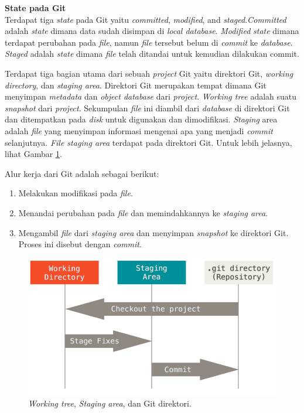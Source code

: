 \documentclass[a4paper,twoside]{article}
\begin{document}
\begin{enumerate}
\textbf{State pada Git}\\
Terdapat tiga \textit{state} pada Git yaitu \textit{committed}, \textit{modified}, and \textit{staged}.\textit{Committed} adalah \textit{state} dimana data sudah disimpan di \textit{local database}. \textit{Modified} \textit{state} dimana terdapat perubahan pada \textit{file}, namun \textit{file} tersebut belum di \textit{commit} ke \textit{database}. \textit{Staged} adalah \textit{state} dimana \textit{file} telah ditandai untuk kemudian dilakukan commit.

Terdapat tiga bagian utama dari sebuah \textit{project} Git yaitu direktori Git, \textit{working directory}, dan \textit{staging area}. Direktori Git merupakan tempat dimana Git menyimpan \textit{metadata} dan \textit{object database} dari \textit{project}. \textit{Working tree} adalah suatu \textit{snapshot} dari \textit{project}. Sekumpulan \textit{file} ini diambil dari \textit{database} di direktori Git dan ditempatkan pada \textit{disk} untuk digunakan dan dimodifikasi. \textit{Staging} area adalah \textit{file} yang menyimpan informasi mengenai apa yang menjadi \textit{commit} selanjutnya. \textit{File staging area} terdapat pada direktori Git. Untuk lebih jelasnya, lihat Gambar \ref{fig:git_state}.

Alur kerja dari Git adalah sebagai berikut:
\begin{enumerate}
\item Melakukan modifikasi pada \textit{file}.
\item Menandai perubahan pada \textit{file} dan memindahkannya ke \textit{staging area}.
\item Mengambil \textit{file} dari \textit{staging area} dan menyimpan \textit{snapshot} ke direktori Git. Proses ini disebut dengan \textit{commit}.
\end{enumerate}  

\begin{figure}[H]
	\centering
		\includegraphics[scale=0.5]{Gambar/git_state.png}
	\caption{ \textit{Working tree}, \textit{Staging area}, dan Git direktori\cite{chacon2014pro}.}
	\label{fig:git_state}
\end{figure}


\end{enumerate}
\end{document}

